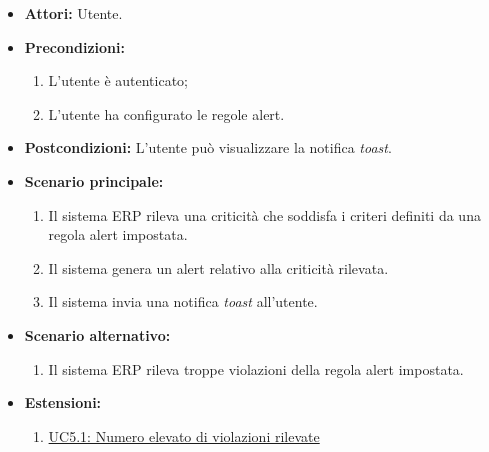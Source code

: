 \label{uc:uc5}
    \begin{itemize}
        \item \textbf{Attori:} Utente.
        \item \textbf{Precondizioni:} 
            \begin{enumerate}
                \item L'utente è autenticato; 
                \item L'utente ha configurato le regole alert.
            \end{enumerate}
        \item \textbf{Postcondizioni:} L'utente può visualizzare la notifica \textit{toast}.
        \item \textbf{Scenario principale:}
            \begin{enumerate}
                \item Il sistema ERP rileva una criticità che soddisfa i criteri definiti da una regola alert impostata.
                \item Il sistema genera un alert relativo alla criticità rilevata.
                \item Il sistema invia una notifica \textit{toast} all'utente.
            \end{enumerate}
        \item \textbf{Scenario alternativo:}
            \begin{enumerate}
                \item Il sistema ERP rileva troppe violazioni della regola alert impostata.
            \end{enumerate}
        \item \textbf{Estensioni:}
            \begin{enumerate}
                \item \hyperref[uc:uc5.1]{UC5.1: Numero elevato di violazioni rilevate}
            \end{enumerate}
    \end{itemize} 

